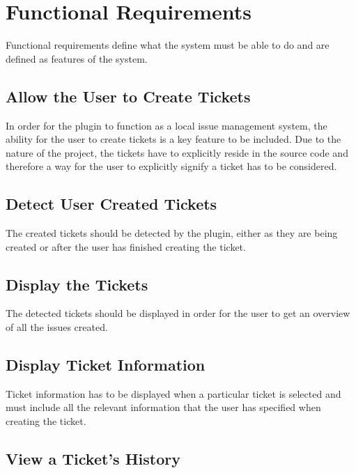 \documentclass{4thYearProject}
\begin{document}

\section{Functional Requirements}

Functional requirements define what the system must be able to do and are defined as features of the system. 

\subsection{Allow the User to Create Tickets}

In order for the plugin to function as a local issue management system, the ability for the user to create tickets is a key feature to be included. Due to the nature of the project, the tickets have to explicitly reside in the source code and therefore a way for the user to explicitly signify a ticket has to be considered.

\subsection{Detect User Created Tickets}

The created tickets should be detected by the plugin, either as they are being created or after the user has finished creating the ticket.

\subsection{Display the Tickets}

The detected tickets should be displayed in order for the user to get an overview of all the issues created.

\subsection{Display Ticket Information}

Ticket information has to be displayed when a particular ticket is selected and must include all the relevant information that the user has specified when creating the ticket.

\subsection{View a Ticket's History}
\end{document}
